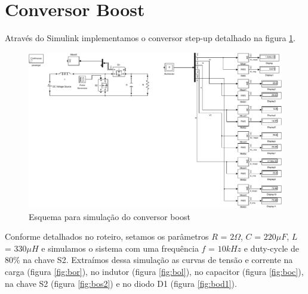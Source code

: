 \documentclass{article}
\begin{document}
\section{Conversor Boost}
Através do Simulink implementamos o conversor step-up detalhado na figura \ref{fig:bosim}.
\begin{figure}[H]
	\centering
	\includegraphics[width=\linewidth]{matlab/boost/bsim}
	\caption{Esquema para simulação do conversor boost}
	\label{fig:bosim}
\end{figure}
Conforme detalhados no roteiro, setamos os parâmetros $R$ = $2\Omega$, $C$ = $220\mu F$, $L$ = $330\mu H$ e simulamos o sistema com uma frequência $f$ = $10kHz$ e duty-cycle de 80\% na chave S2.
Extraímos dessa simulação as curvas de tensão e corrente na carga (figura \ref{fig:bor}), no indutor (figura \ref{fig:bol}), no capacitor (figura \ref{fig:boc}), na chave S2 (figura \ref{fig:bos2}) e no diodo D1 (figura \ref{fig:bod1}).
\end{document}
